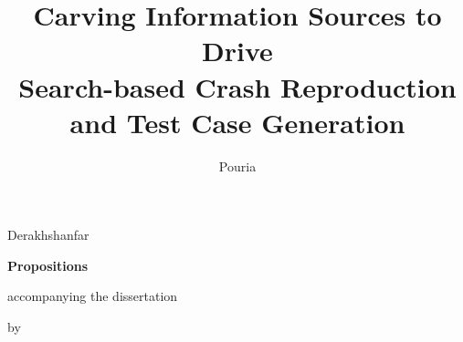 \documentclass{propositions}
\begin{document}
\title{Carving Information Sources to Drive\\ Search-based Crash Reproduction and Test Case Generation}
\author{Pouria}{Derakhshanfar}

\begin{center}

{\Large\titlefont\bfseries Propositions}

\medskip

accompanying the dissertation

\medskip

{\makeatletter
\titlestyle\bfseries\large\@title
\makeatother}

{\makeatletter
\ifx\@subtitle\undefined\else
    \titlefont\titleshape\@subtitle
\fi
\makeatother}

\medskip

by

\medskip

\makeatletter
{\large\titlefont\bfseries\@firstname\ {\titleshape\@lastname}}
\makeatother

\end{center}

\bigskip
\end{document}
